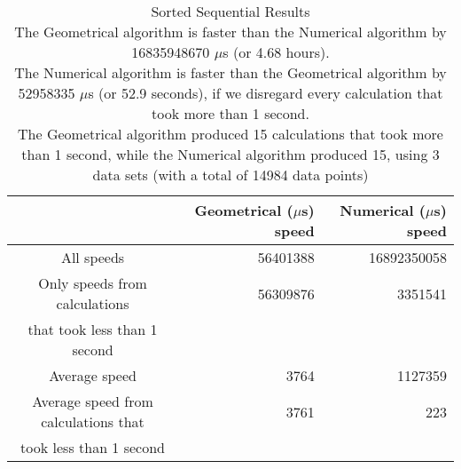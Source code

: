 \begin{table}[bth!]\footnotesize
 \begin{tabular}[3]{c|r|r}
 & Geometrical ($\mu$s) speed & Numerical ($\mu$s) speed\\
\hline
All speeds & 56401388 & 16892350058 \\ 
\hline 
Only speeds from calculations & 56309876 & 3351541 \\ 
that took less than 1 second & & \\ 
\hline
Average speed & 3764 & 1127359 \\
\hline
Average speed from calculations that & 3761 & 223 \\ 
took less than 1 second & & \\ 
\end{tabular}\\ \\
\caption{Sorted Sequential Results\\
The Geometrical algorithm is faster than the Numerical algorithm by 16835948670 $\mu$s (or 4.68 hours).\\
The Numerical algorithm is faster than the Geometrical algorithm by 52958335 $\mu$s (or 52.9 seconds), if we disregard every calculation that took more than 1 second.\\
The Geometrical algorithm produced 15 calculations that took more than 1 second, while the Numerical algorithm produced 15, using 3 data sets (with a total of 14984 data points)\\
}\label{sequential-normal_speedtable}\end{table}